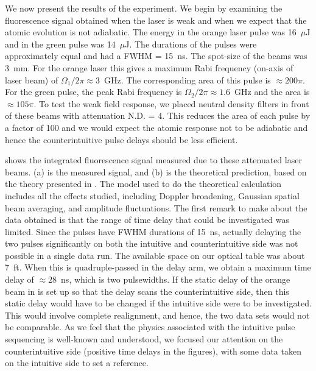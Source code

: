 We now present the results of the experiment.  We begin by examining the
fluorescence signal obtained when the laser is weak and when we expect that the
atomic evolution is not adiabatic.  The energy in the orange laser pulse was
16~$\mu$J and in the green pulse was 14~$\mu$J.  The durations of the pulses were
approximately equal and had a FWHM = 15~ns.  The spot-size of the beams was
3~mm.  For the orange laser this gives a maximum Rabi frequency (on-axis of laser
beam) of $\Omega_1/2\pi \approx 3$~GHz.  The corresponding area of this pulse is
$\approx 200\pi$.  For the green pulse, the peak Rabi frequency is
$\Omega_2/2\pi \approx 1.6$~GHz and the area is $\approx 105\pi$.  To test the
weak field response, we placed neutral density filters in front of these beams
with attenuation N.D. = 4.  This reduces the area of each pulse by a factor
of 100 and we would expect the atomic response not to be adiabatic and
hence the counterintuitive pulse delays should be less efficient.

\begin{figure}[tbp]
\bigskip
{}
\end{figure}

 shows the integrated fluorescence signal measured due to
these attenuated laser beams.  (a) is the measured signal, and
(b) is the theoretical prediction, based on the theory
presented in .  The model used to do the theoretical
calculation includes all the effects studied, including Doppler broadening,
Gaussian spatial beam averaging, and amplitude fluctuations.  The first remark
to make about the data obtained is that the range of time delay that could be
investigated was limited.  Since the pulses have FWHM durations of 15~ns,
actually delaying the two pulses significantly on both the intuitive and
counterintuitive side was not possible in a single data run.  The available
space on our optical table was about 7~ft.  When this is quadruple-passed
in the delay arm, we obtain a maximum time delay of $\approx 28$~ns, which is two
pulsewidths.  If the static delay of the orange beam in  is set up
so that the delay scans the counterintuitive side, then this static delay would
have to be changed if the intuitive side were to be investigated.  This would
involve complete realignment, and hence, the two data sets would not be
comparable.  As we feel that the physics associated with the intuitive pulse
sequencing is well-known and understood, we focused our attention on the
counterintuitive side (positive time delays in the figures), with some data
taken on the intuitive side to set a reference.

